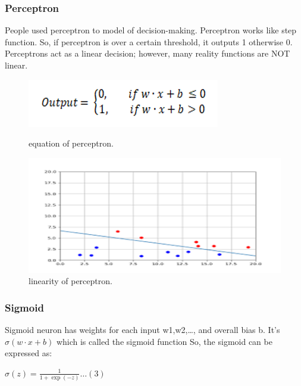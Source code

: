 \documentclass{article}
\begin{document}
\subsubsection{Perceptron}
People used perceptron to model of decision-making. Perceptron works like step function. So, if perceptron is over a certain threshold, it outputs 1 otherwise 0.
Perceptrons act as a linear decision; however, many reality functions are NOT linear.
\begin{figure}[H]
  \centering
  \begin{minipage}[b]{0.4\textwidth}
    \includegraphics[width=\textwidth]{percept.png}
    \caption{equation of perceptron.}
  \end{minipage}
  \hfill
  \begin{minipage}[b]{0.4\textwidth}
    \includegraphics[width=\textwidth]{percept2.png}
    \caption{linearity of perceptron.\protect\cite{Percept}}
  \end{minipage}
\end{figure}

\subsubsection{Sigmoid}
Sigmoid neuron has weights for each input w1,w2,\dots , and overall bias b. 
It’s $\sigma{(w \cdot x+b)}$ which is called the sigmoid function
So, the sigmoid can be expressed as:

$\sigma{(z)} =\frac{1}{1+\exp(-z)} \dots (3)$
\end{document}
